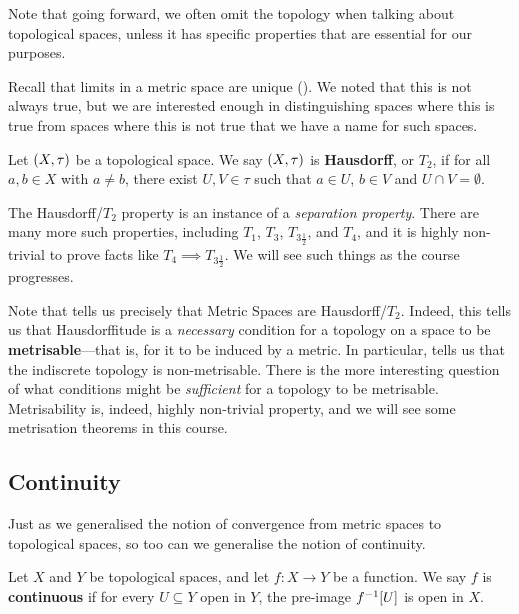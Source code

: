 Note that going forward, we often omit the topology when talking about topological spaces, unless it has specific properties that are essential for our purposes.

Recall that limits in a metric space are unique (). We noted that this is not always true, but we are interested enough in distinguishing spaces where this is true from spaces where this is not true that we have a name for such spaces.

\begin{boxdefinition}\label{Ch1:Def:Hausdorff}
    Let $\left( X, \tau \right)$ be a topological space. We say $\left( X, \tau \right)$ is \textbf{Hausdorff}, or $T_2$, if for all $a, b \in X$ with $a \neq b$, there exist $U, V \in \tau$ such that $a \in U$, $b \in V$ and $U \cap V = \emptyset$.
\end{boxdefinition}

The Hausdorff/$T_2$ property is an instance of a \textit{separation property}. There are many more such properties, including $T_1$, $T_3$, $T_{3 \frac{1}{2}}$, and $T_4$, and it is highly non-trivial to prove facts like $T_4 \implies T_{3 \frac{1}{2}}$. We will see such things as the course progresses.

Note that  tells us precisely that Metric Spaces are Hausdorff/$T_2$. Indeed, this tells us that Hausdorffitude is a \textit{necessary} condition for a topology on a space to be \textbf{metrisable}---that is, for it to be induced by a metric. In particular,  tells us that the indiscrete topology is non-metrisable. There is the more interesting question of what conditions might be \textit{sufficient} for a topology to be metrisable. Metrisability is, indeed, highly non-trivial property, and we will see some metrisation theorems in this course.

\subsection{Continuity}

Just as we generalised the notion of convergence from metric spaces to topological spaces, so too can we generalise the notion of continuity.

\begin{boxdefinition}[Continuity]\label{Ch1:Def:Continuity_Topological}
    Let $X$ and $Y$ be topological spaces, and let $f : X \to Y$ be a function. We say $f$ is \textbf{continuous} if for every $U \subseteq Y$ open in $Y$, the pre-image $f^{-1}\!\left[ U \right]$ is open in $X$.
\end{boxdefinition}

